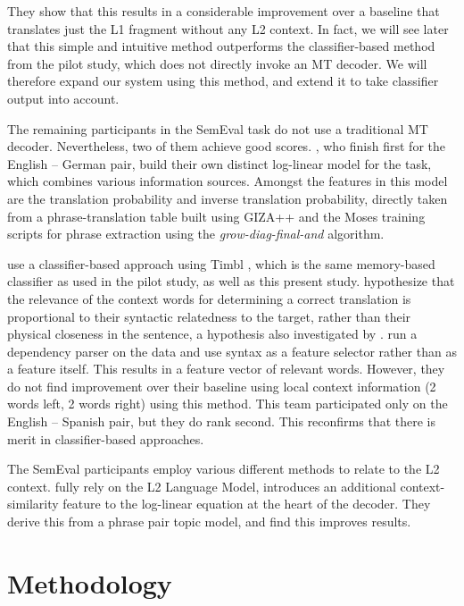 They show that this results in a considerable improvement over a baseline that
translates just the L1 fragment without any L2 context. In fact, we will see
later that this simple and intuitive method outperforms the 
classifier-based method from the pilot study, which does not directly invoke
an MT decoder. We will therefore expand our system using this method, and
extend it to take classifier output into account.

The remaining participants in the SemEval task do not use a
traditional MT decoder. Nevertheless, two of them achieve good scores.
\cite{IUCL}, who finish first for the English -- German pair, build
their own distinct log-linear model for the task, which combines
various information sources. Amongst the features in this model are
the translation probability and inverse translation probability,
directly taken from a phrase-translation table built using GIZA++
\citep{GIZA} and the Moses training scripts for phrase extraction
using the {\em grow-diag-final-and}\/ algorithm.

\cite{UNAL} use a classifier-based approach using Timbl \citep{TIMBL},
which is the same memory-based classifier as used in the pilot study,
as well as this present study. \cite{UNAL} hypothesize that the
relevance of the context words for determining a correct translation
is proportional to their syntactic relatedness to the target, rather
than their physical closeness in the sentence, a hypothesis also
investigated by \cite{Haque+11}. \cite{UNAL} run a dependency parser
on the data and use syntax as a feature selector rather than as a
feature itself. This results in a feature vector of relevant
words. However, they do not find improvement over their baseline using
local context information (2 words left, 2 words right) using this
method. This team participated only on the English -- Spanish pair,
but they do rank second. This reconfirms that there is merit in
classifier-based approaches.

The SemEval participants employ various different methods to relate to
the L2 context. \cite{CNRC} fully rely on the L2 Language Model,
\cite{UEDIN} introduces an additional context-similarity feature to
the log-linear equation at the heart of the decoder. They derive this
from a phrase pair topic model, and find this improves results.


\section{Methodology}
\label{methodology}

